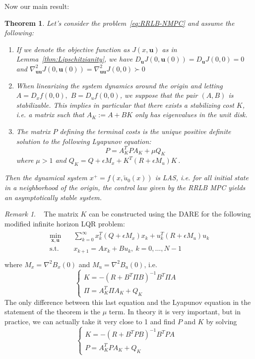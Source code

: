 \documentclass[journal]{IEEEtran}
\newtheorem{theorem}{Theorem}[section]
\theoremstyle{definition}
\theoremstyle{remark}
\newtheorem*{remark}{Remark}
\def\bf#1{\mathbf{#1}}
\begin{document}
\noindent Now our main result:

\begin{theorem}\label{thm:nominal-stability}
	Let's consider the problem~\ref{eq:RRLB-NMPC} and assume the following:
	\begin{enumerate}
		\item If we denote the objective function as $J(x,\bf{u})$ as in Lemma~\ref{thm:Lipschitzianity}, we have $D_\bf{u}J(0,\bf{u}(0))=D_\bf{u}J(0,0)=0$ and $\nabla^2_{\bf{u}\bf{u}}J(0,\bf{u}(0))=\nabla^2_{\bf{u}\bf{u}}J(0,0)\succ 0$

		\item When linearizing the system dynamics around the origin and letting $A=D_xf(0,0),$ $B=D_uf(0,0)$, we suppose that the pair $(A,B)$ is stabilizable.
		This implies in particular that there exists a stabilizing cost $K$, i.e. a matrix such that $A_K:=A+BK$ only has eigenvalues in the unit disk.

		\item The matrix $P$ defining the terminal costs is the unique positive definite solution to the following Lyapunov equation:
		\begin{equation*}
			P=A_K^TPA_K+\mu Q_K
		\end{equation*}
		where $\mu>1$ and $Q_K=Q+\epsilon M_x+K^T(R+\epsilon M_u)K$\,.
	\end{enumerate}
	Then the dynamical system $x^+=f(x,\tilde{u}_0(x))$ is LAS, i.e. for all initial state in a neighborhood of the origin, the control law given by the RRLB MPC yields an asymptotically stable system.
\end{theorem}

\begin{remark}~
	The matrix $K$ can be constructed using the DARE for the following modified infinite horizon LQR problem:
	\begin{align}
		\begin{split}\label{eq:inf-LQR}
			\underset{\bf{x},\bf{u}}{\min} &\quad \sum_{k=0}^\infty x_k^T(Q+\epsilon M_x)x_k+u_k^T(R+\epsilon M_u)u_k\\
			\text{s.t.} &\quad x_{k+1}=Ax_k+Bu_k,~k=0,\ldots,N-1\\
		\end{split}
	\end{align}
	where $M_x=\nabla^2B_x(0)$ and $M_u=\nabla^2B_u(0)$, i.e.
	$$\begin{cases}
		K=-(R+B^T\Pi B)^{-1}B^T\Pi A&\\
		\Pi=A_K^T\Pi A_K+Q_K
	\end{cases}$$
	The only difference between this last equation and the Lyapunov equation in the statement of the theorem is the $\mu$ term.
	In theory it is very important, but in practice, we can actually take it very close to 1 and find $P$ and $K$ by solving
	$$\begin{cases}
		K=-(R+B^TP B)^{-1}B^TP A&\\
		P=A_K^TP A_K+Q_K
	\end{cases}$$
\end{remark}
\end{document}
